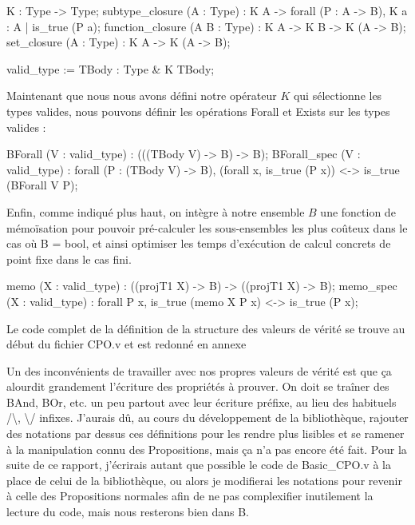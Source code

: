 \documentclass{article}
\newcommand\code[1]{{\fontfamily{lmtt}\selectfont #1}}
\theoremstyle{definition}
\begin{document}
\begin{coq}
  K : Type -> Type;
  subtype_closure (A : Type) : K A -> forall (P : A -> B), 
  										K {a : A | is_true (P a)};
  function_closure (A B : Type) : K A -> K B -> K (A -> B);
  set_closure (A : Type) : K A -> K (A -> B);
  
  valid_type := { TBody : Type & K TBody};
\end{coq}

Maintenant que nous nous avons défini notre opérateur $K$ qui sélectionne les types valides, nous pouvons définir les opérations \code{Forall} et \code{Exists} sur les types valides :

\begin{coq}  
  BForall (V : valid_type) : (((TBody V) -> B) -> B);
  BForall_spec (V : valid_type) : forall (P : (TBody V) -> B), 
    (forall x, is_true (P x)) <-> is_true (BForall V P);
\end{coq}


Enfin, comme indiqué plus haut, on intègre à notre ensemble $B$ une fonction de mémoïsation pour pouvoir pré-calculer les sous-ensembles les plus coûteux dans le cas où \code{B = bool}, et ainsi optimiser les temps d'exécution de calcul concrets de point fixe dans le cas fini.

\begin{coq}
  memo (X : valid_type) : ((projT1 X) -> B) -> ((projT1 X) -> B);
  memo_spec (X : valid_type) : forall P x, is_true (memo X P x) <-> is_true (P x);
\end{coq}

Le code complet de la définition de la structure des valeurs de vérité se trouve au début du fichier \code{CPO.v} et est redonné en annexe %

\medskip

Un des inconvénients de travailler avec nos propres valeurs de vérité est que ça alourdit grandement l'écriture des propriétés à prouver. On doit se traîner des \code{BAnd}, \code{BOr}, etc. un peu partout avec leur écriture préfixe, au lieu des habituels /\textbackslash, \textbackslash / infixes. J'aurais dû, au cours du développement de la bibliothèque, rajouter des notations par dessus ces définitions pour les rendre plus lisibles et se ramener à la manipulation connu des Propositions, mais ça n'a pas encore été fait. Pour la suite de ce rapport, j'écrirais autant que possible le code de \code{Basic\_CPO.v} à la place de celui de la bibliothèque, ou alors je modifierai les notations pour revenir à celle des Propositions normales afin de ne pas complexifier inutilement la lecture du code, mais nous resterons bien dans B.
\end{document}
